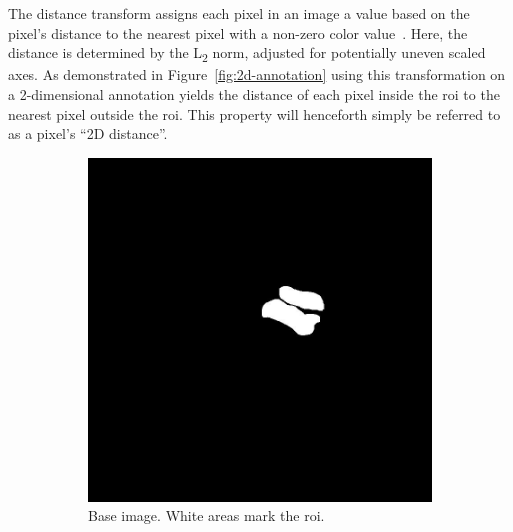 The distance transform assigns each pixel in an image a value based on the
pixel's distance to the nearest pixel with a non-zero color 
value~\cite{2020SciPy-NMeth}. Here, the distance is determined by the 
L\textsubscript{2} norm, adjusted for potentially uneven scaled axes. As 
demonstrated in Figure~\ref{fig:2d-annotation} using this transformation on a 
2-dimensional annotation yields the distance of each pixel inside the 
\ac{roi} to the nearest pixel outside the \ac{roi}. This property will 
henceforth simply be referred to as a pixel's \enquote{2D distance}.

\begin{figure}[H]
    \centering
    \begin{subfigure}[t]{0.4\textwidth}
        \includegraphics[width=\textwidth]{img/img_base_mr1a.jpg}
        \caption{Base image. White areas mark the \ac{roi}.}\label{fig:2d-base}
    \end{subfigure}
    ~
    \begin{subfigure}[t]{0.4\textwidth}

\end{subfigure}
\end{figure}
